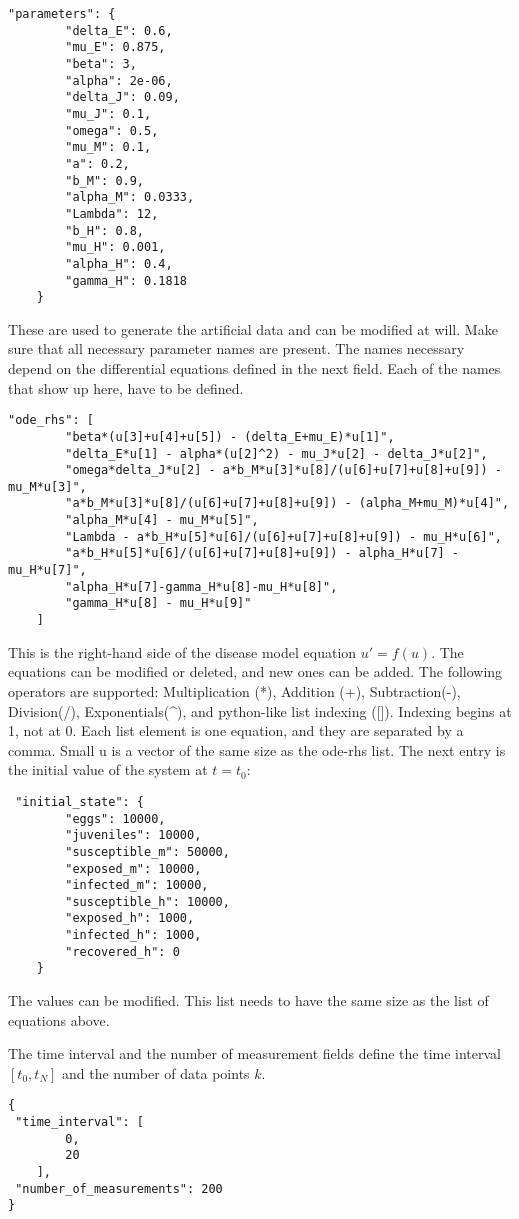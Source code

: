 \documentclass{article}
\begin{document}
\begin{verbatim}
"parameters": {
        "delta_E": 0.6,
        "mu_E": 0.875,
        "beta": 3,
        "alpha": 2e-06,
        "delta_J": 0.09,
        "mu_J": 0.1,
        "omega": 0.5,
        "mu_M": 0.1,
        "a": 0.2,
        "b_M": 0.9,
        "alpha_M": 0.0333,
        "Lambda": 12,
        "b_H": 0.8,
        "mu_H": 0.001,
        "alpha_H": 0.4,
        "gamma_H": 0.1818
    }
\end{verbatim}
These are used to generate the artificial data and can be modified at will. Make sure that all necessary parameter names are present. The names necessary depend on the differential equations defined in the next field. Each of the names that show up here, have to be defined.
\begin{verbatim}
"ode_rhs": [
        "beta*(u[3]+u[4]+u[5]) - (delta_E+mu_E)*u[1]",
        "delta_E*u[1] - alpha*(u[2]^2) - mu_J*u[2] - delta_J*u[2]",
        "omega*delta_J*u[2] - a*b_M*u[3]*u[8]/(u[6]+u[7]+u[8]+u[9]) - mu_M*u[3]",
        "a*b_M*u[3]*u[8]/(u[6]+u[7]+u[8]+u[9]) - (alpha_M+mu_M)*u[4]",
        "alpha_M*u[4] - mu_M*u[5]",
        "Lambda - a*b_H*u[5]*u[6]/(u[6]+u[7]+u[8]+u[9]) - mu_H*u[6]",
        "a*b_H*u[5]*u[6]/(u[6]+u[7]+u[8]+u[9]) - alpha_H*u[7] - mu_H*u[7]",
        "alpha_H*u[7]-gamma_H*u[8]-mu_H*u[8]",
        "gamma_H*u[8] - mu_H*u[9]"
    ]
\end{verbatim}
This is the right-hand side of the disease model equation $u' = f(u)$. The equations can be modified or deleted, and new ones can be added. The following operators are supported:
Multiplication (*), Addition (+), Subtraction(-), Division(/), Exponentials(\^{}), and python-like list indexing ([\quad]). Indexing begins at 1, not at 0. Each list element is one equation, and they are separated by a comma. Small u is a vector of the same size as the ode-rhs list. 
\newpage
The next entry is the initial value of the system at $t=t_0$:
\begin{verbatim}
 "initial_state": {
        "eggs": 10000,
        "juveniles": 10000,
        "susceptible_m": 50000,
        "exposed_m": 10000,
        "infected_m": 10000,
        "susceptible_h": 10000,
        "exposed_h": 1000,
        "infected_h": 1000,
        "recovered_h": 0
    }
\end{verbatim}
The values can be modified. This list needs to have the same size as the list of equations above.

The time interval and the number of measurement fields define the time interval $[t_0, t_N]$ and the number of data points $k$.
\begin{verbatim}
{
 "time_interval": [
        0,
        20
    ],
 "number_of_measurements": 200
}
\end{verbatim}
\end{document}
